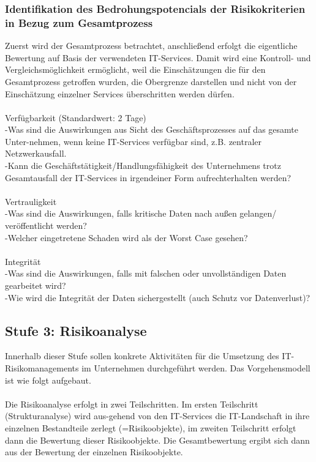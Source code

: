 \subsubsection{Identifikation des Bedrohungspotencials der Risikokriterien in Bezug zum Gesamtprozess}
Zuerst wird der Gesamtprozess betrachtet, anschließend erfolgt die eigentliche Bewertung auf Basis der verwendeten IT-Services. Damit wird eine Kontroll- und Vergleichsmöglichkeit ermöglicht, weil die Einschätzungen die für den Gesamtprozess getroffen wurden, die Obergrenze darstellen und nicht von der Einschätzung einzelner Services überschritten werden dürfen.\\
\\Verfügbarkeit (Standardwert: 2 Tage)
\\-Was sind die Auswirkungen aus Sicht des Geschäftsprozesses auf das gesamte Unter-nehmen, wenn keine IT-Services verfügbar sind, z.B. zentraler Netzwerkausfall.\\
-Kann die Geschäftstätigkeit/Handlungsfähigkeit des Unternehmens trotz Gesamtausfall der IT-Services in irgendeiner Form aufrechterhalten werden?\\
\\Vertrauligkeit
\\-Was sind die Auswirkungen, falls kritische Daten nach außen gelangen/ veröffentlicht werden?
\\-Welcher eingetretene Schaden wird als der Worst Case gesehen?\\
\\Integrität
\\-Was sind die Auswirkungen, falls mit falschen oder unvollständigen Daten gearbeitet wird?
\\-Wie wird die Integrität der Daten sichergestellt (auch Schutz vor Datenverlust)?
\subsection{Stufe 3: Risikoanalyse}
Innerhalb dieser Stufe sollen konkrete Aktivitäten für die Umsetzung des IT-Risikomanagements im Unternehmen durchgeführt werden. Das Vorgehensmodell ist wie folgt aufgebaut.\\
\\Die Risikoanalyse erfolgt in zwei Teilschritten. Im ersten Teilschritt (Strukturanalyse) wird aus-gehend von den IT-Services die IT-Landschaft in ihre einzelnen Bestandteile zerlegt (=Risikoobjekte), im zweiten Teilschritt erfolgt dann die Bewertung dieser Risikoobjekte. Die Gesamtbewertung ergibt sich dann aus der Bewertung der einzelnen Risikoobjekte.
